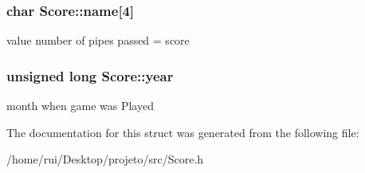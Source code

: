 \subsubsection[{\texorpdfstring{name}{name}}]{\setlength{\rightskip}{0pt plus 5cm}char Score\+::name\mbox{[}4\mbox{]}}\hypertarget{structScore_aaedadfca0777f0b02a0693f7bc33d948}{}\label{structScore_aaedadfca0777f0b02a0693f7bc33d948}
value number of pipes passed = score 
\subsubsection[{\texorpdfstring{year}{year}}]{\setlength{\rightskip}{0pt plus 5cm}unsigned long Score\+::year}\hypertarget{structScore_ac8b7159609235b1cf0bbe6f82a3e0db3}{}\label{structScore_ac8b7159609235b1cf0bbe6f82a3e0db3}
month when game was Played 

The documentation for this struct was generated from the following file\+:\begin{DoxyCompactItemize}
\item 
/home/rui/\+Desktop/projeto/src/Score.\+h\end{DoxyCompactItemize}
